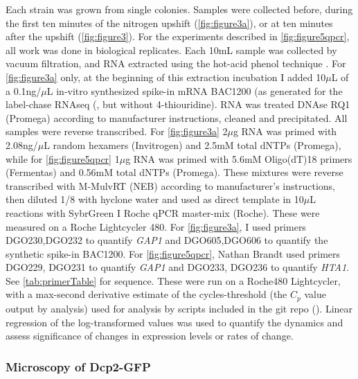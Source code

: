 Each strain was grown from single colonies.
Samples were collected before, during the first ten minutes of
the nitrogen upshift (\autoref{fig:figure3a}),
or at ten minutes after the upshift (\autoref{fig:figure3}).
For the experiments described in
\autoref{fig:figure5qpcr}, all work
was done in biological replicates.
Each 10mL sample was collected by vacuum filtration, and RNA extracted
using the hot-acid phenol technique .
For \autoref{fig:figure3a} only, at the beginning of this extraction 
incubation I added 10$\mu$L of a 0.1ng/$\mu$L in-vitro synthesized 
spike-in mRNA BAC1200 (as generated
for the label-chase RNAseq (,
but without 4-thiouridine). 
RNA was treated DNAse RQ1 (Promega) according to manufacturer
instructions, cleaned and precipitated.
All samples were reverse transcribed. 
For \autoref{fig:figure3a} 2$\mu$g RNA was primed with 2.08ng/$\mu$L
random hexamers (Invitrogen) and 2.5mM total dNTPs (Promega),
while for \autoref{fig:figure5qpcr} 1$\mu$g RNA was primed with 
5.6mM Oligo(dT)18 primers (Fermentas) and
0.56mM total dNTPs (Promega).
These mixtures were reverse transcribed with M-MulvRT (NEB) according
to manufacturer's instructions, then diluted 1/8 with hyclone water 
and used as direct template in 10$\mu$L reactions with SybrGreen I 
Roche qPCR master-mix (Roche). These were measured
on a Roche Lightcycler 480. 
For \autoref{fig:figure3a}, I used primers 
DGO230,DGO232 to quantify \textit{GAP1} and 
DGO605,DGO606 to quantify the synthetic spike-in BAC1200.
For \autoref{fig:figure5qpcr}, Nathan Brandt used primers
DGO229, DGO231 to quantify \textit{GAP1} and
DGO233, DGO236 to quantify \textit{HTA1}.  
See \autoref{tab:primerTable} for sequence.
These were run on a Roche480 Lightcycler, 
with a max-second derivative estimate
of the cycles-threshold (the $C_p$ value output by analysis) used 
for analysis by scripts included in the git repo 
().
Linear regression of the log-transformed values was used to quantify
the dynamics and assess significance of changes in expression
levels or rates of change.

\subsubsection{Microscopy of Dcp2-GFP}

